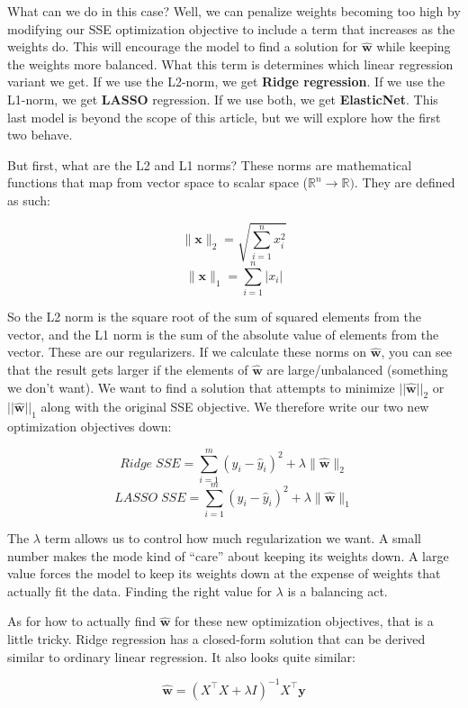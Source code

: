 \begin{flushleft}
    What can we do in this case? Well, we can penalize weights becoming too high by modifying our SSE optimization objective to include a term that increases as the weights do. This will encourage the model to find a solution for $\hat{\textbf{w}}$ while keeping the weights more balanced. What this term is determines which linear regression variant we get. If we use the L2-norm, we get \textbf{Ridge regression}. If we use the L1-norm, we get \textbf{LASSO} regression. If we use both, we get \textbf{ElasticNet}. This last model is beyond the scope of this article, but we will explore how the first two behave. \break

    But first, what are the L2 and L1 norms? These norms are mathematical functions that map from vector space to scalar space ($\mathbb{R}^n \rightarrow \mathbb{R})$. They are defined as such:

    $$\|\textbf{x}\|_2 = \sqrt{\sum_{i=1}^n x_i^2}$$
    $$\|\textbf{x}\|_1 = \sum_{i=1}^n \vert x_i \vert$$

    So the L2 norm is the square root of the sum of squared elements from the vector, and the L1 norm is the sum of the absolute value of elements from the vector. These are our regularizers. If we calculate these norms on $\hat{\textbf{w}}$, you can see that the result gets larger if the elements of $\hat{\textbf{w}}$ are large/unbalanced (something we don't want). We want to find a solution that attempts to minimize $||\hat{\textbf{w}}||_2$ or $||\hat{\textbf{w}}||_1$ along with the original SSE objective. We therefore write our two new optimization objectives down:

    $$Ridge\;SSE = \sum_{i=1}^{m} (y_i - \hat{y}_i)^2 + \lambda\|\hat{\textbf{w}}\|_2$$
    $$LASSO\;SSE = \sum_{i=1}^{m} (y_i - \hat{y}_i)^2 + \lambda\|\hat{\textbf{w}}\|_1$$

    The $\lambda$ term allows us to control how much regularization we want. A small number makes the mode kind of ``care'' about keeping its weights down. A large value forces the model to keep its weights down at the expense of weights that actually fit the data. Finding the right value for $\lambda$ is a balancing act. \break

    As for how to actually find $\hat{\textbf{w}}$ for these new optimization objectives, that is a little tricky. Ridge regression has a closed-form solution that can be derived similar to ordinary linear regression. It also looks quite similar:

    $$\hat{\textbf{w}} = (X^{\top}X + \lambda I)^{-1}X^{\top}\textbf{y}$$


\end{flushleft}
